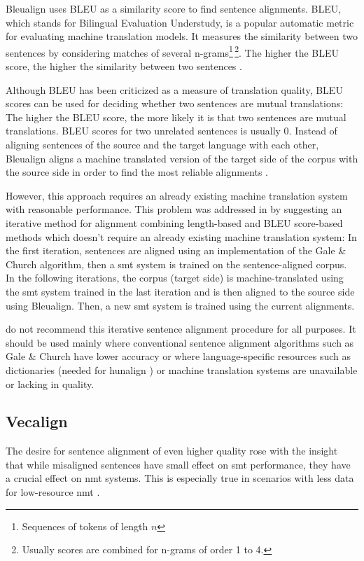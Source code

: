 Bleualign uses BLEU as a similarity score to find sentence alignments. 
BLEU, which stands for Bilingual Evaluation Understudy, is a popular automatic metric for evaluating machine translation models. It measures the similarity between two sentences by considering matches of several n-grams\footnote{Sequences of tokens of length \(n\)}\,\footnote{Usually scores are combined for n-grams of order 1 to 4.}. 
The higher the BLEU score, the higher the similarity between two sentences \autocite[226]{koehn2009}.

Although BLEU has been criticized as a measure of translation quality, BLEU scores can be used for deciding whether two sentences are mutual translations:  
The higher the BLEU score, the more likely it is that two sentences are mutual translations. 
BLEU scores for two unrelated sentences is usually 0. Instead of aligning sentences of the source and the target language with each other, Bleualign aligns a machine translated version of the target side of the corpus with the source side in order to find the most reliable alignments \autocite{sennrich-volk-2010-mt}. 

However, this approach requires an already existing machine translation system with reasonable performance. 
This problem was addressed in \cite{sennrich-volk-2011-iterative} by suggesting an iterative method for alignment combining length-based and BLEU score-based methods which doesn't require an already existing machine translation system: 
In the first iteration, sentences are aligned using an implementation of the Gale \& Church algorithm, then a \acrfull{smt} system is trained on the sentence-aligned corpus. 
In the following iterations, the corpus (target side) is machine-translated using the \acrshort{smt} system trained in the last iteration and is then aligned to the source side using Bleualign. 
Then, a new \acrshort{smt} system is trained using the current alignments.

\cite{sennrich-volk-2011-iterative} do not recommend this iterative sentence alignment procedure for all purposes. 
It should be used mainly where conventional sentence alignment algorithms such as Gale \& Church have lower accuracy or where language-specific resources such as dictionaries (needed for hunalign \autocite{hunalign}) or machine translation systems are unavailable or lacking in quality.

\subsection{Vecalign}
The desire for  sentence alignment of even higher quality rose with the insight that while misaligned sentences have small effect on \acrshort{smt} performance, they have a crucial effect on \acrfull{nmt} systems. 
This is especially true in scenarios with less data for low-resource \acrshort{nmt} \autocite{thompson-koehn-2019-vecalign}. 

